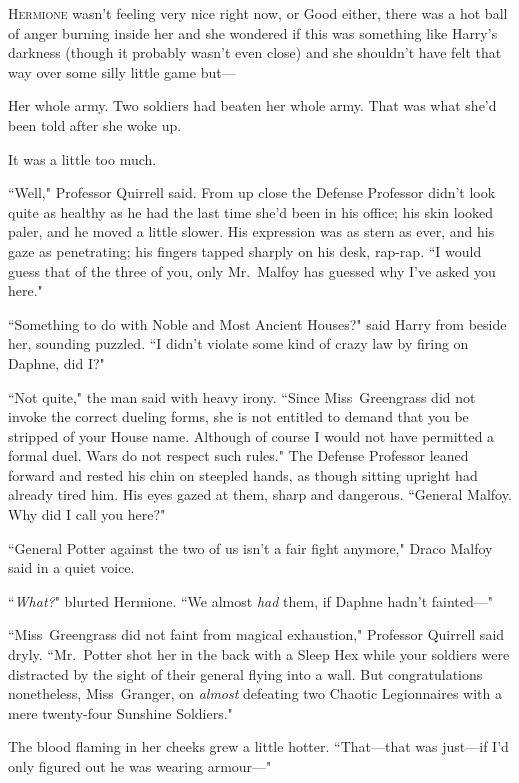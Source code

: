 
\lettrine{H}{ermione} wasn't feeling very nice right now, or Good either, there was a hot ball of anger burning inside her and she wondered if this was something like Harry's darkness (though it probably wasn't even close) and she shouldn't have felt that way over some silly little game but—

Her whole army. Two soldiers had beaten her whole army. That was what she'd been told after she woke up.

It was a little too much.

``Well," Professor Quirrell said. From up close the Defense Professor didn't look quite as healthy as he had the last time she'd been in his office; his skin looked paler, and he moved a little slower. His expression was as stern as ever, and his gaze as penetrating; his fingers tapped sharply on his desk, rap-rap. ``I would guess that of the three of you, only Mr.~Malfoy has guessed why I've asked you here."

``Something to do with Noble and Most Ancient Houses?" said Harry from beside her, sounding puzzled. ``I didn't violate some kind of crazy law by firing on Daphne, did I?"

``Not quite," the man said with heavy irony. ``Since Miss~Greengrass did not invoke the correct dueling forms, she is not entitled to demand that you be stripped of your House name. Although of course I would not have permitted a formal duel. Wars do not respect such rules." The Defense Professor leaned forward and rested his chin on steepled hands, as though sitting upright had already tired him. His eyes gazed at them, sharp and dangerous. ``General Malfoy. Why did I call you here?"

``General Potter against the two of us isn't a fair fight anymore," Draco Malfoy said in a quiet voice.

``\emph{What?}" blurted Hermione. ``We almost \emph{had} them, if Daphne hadn't fainted—"

``Miss~Greengrass did not faint from magical exhaustion," Professor Quirrell said dryly. ``Mr.~Potter shot her in the back with a Sleep Hex while your soldiers were distracted by the sight of their general flying into a wall. But congratulations nonetheless, Miss~Granger, on \emph{almost} defeating two Chaotic Legionnaires with a mere twenty-four Sunshine Soldiers."

The blood flaming in her cheeks grew a little hotter. ``That—that was just—if I'd only figured out he was wearing armour—"

